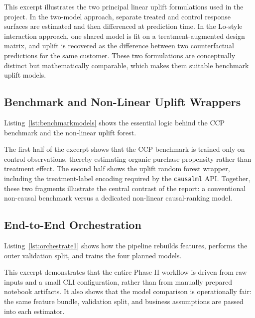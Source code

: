 \documentclass[11pt,a4paper]{article}
\begin{document}
This excerpt illustrates the two principal linear uplift formulations used in the project. In the two-model approach, separate treated and control response surfaces are estimated and then differenced at prediction time. In the Lo-style interaction approach, one shared model is fit on a treatment-augmented design matrix, and uplift is recovered as the difference between two counterfactual predictions for the same customer. These two formulations are conceptually distinct but mathematically comparable, which makes them suitable benchmark uplift models.

\subsection{Benchmark and Non-Linear Uplift Wrappers}
Listing~\ref{lst:benchmarkmodels} shows the essential logic behind the CCP benchmark and the non-linear uplift forest.



The first half of the excerpt shows that the CCP benchmark is trained only on control observations, thereby estimating organic purchase propensity rather than treatment effect. The second half shows the uplift random forest wrapper, including the treatment-label encoding required by the \texttt{causalml} API. Together, these two fragments illustrate the central contrast of the report: a conventional non-causal benchmark versus a dedicated non-linear causal-ranking model.

\subsection{End-to-End Orchestration}
Listing~\ref{lst:orchestrate1} shows how the pipeline rebuilds features, performs the outer validation split, and trains the four planned models.



This excerpt demonstrates that the entire Phase II workflow is driven from raw inputs and a small CLI configuration, rather than from manually prepared notebook artifacts. It also shows that the model comparison is operationally fair: the same feature bundle, validation split, and business assumptions are passed into each estimator.
\end{document}
